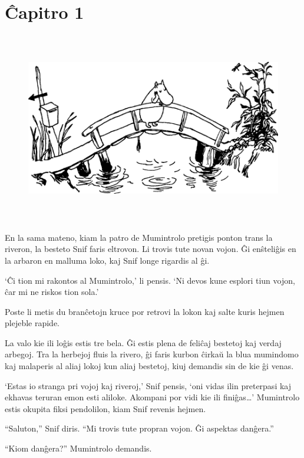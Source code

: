 \chapter*[Ĉapitro 1]{Ĉapitro 1}


\begin{figure}[htbp]
\centering
\includegraphics[width=450pt,height=237pt]{1-1.png}
\caption{}
\label{1-1}
\end{figure}

En la sama mateno, kiam la patro de Mumintrolo pretigis ponton trans la riveron, la besteto Snif faris eltrovon. Li trovis tute novan vojon. Ĝi enŝteliĝis en la arbaron en malluma loko, kaj Snif longe rigardis al ĝi.

`Ĉi tion mi rakontos al Mumintrolo,' li pensis. `Ni devos kune esplori tiun vojon, ĉar mi ne riskos tion sola.'

Poste li metis du branĉetojn kruce por retrovi la lokon kaj salte kuris hejmen plejeble rapide.

La valo kie ili loĝis estis tre bela. Ĝi estis plena de feliĉaj bestetoj kaj verdaj arbegoj. Tra la herbejoj fluis la rivero, ĝi faris kurbon ĉirkaŭ la blua mumindomo kaj malaperis al aliaj lokoj kun aliaj bestetoj, kiuj demandis sin de kie ĝi venas.

`Estas io stranga pri vojoj kaj riveroj,' Snif pensis, `oni vidas ilin preterpasi kaj ekhavas teruran emon esti aliloke. Akompani por vidi kie ili finiĝas{\ldots}'
\sectionbreak
Mumintrolo estis okupita fiksi pendolilon, kiam Snif revenis hejmen.

``Saluton,'' Snif diris. ``Mi trovis tute propran vojon. Ĝi aspektas danĝera.''

``Kiom danĝera?'' Mumintrolo demandis.

